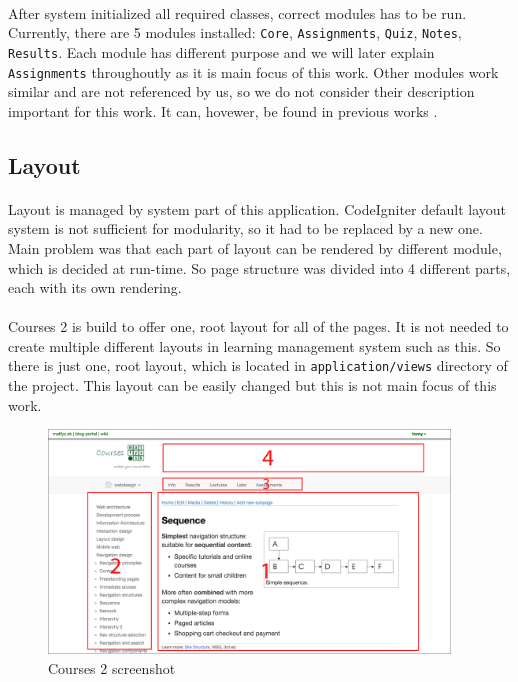 \paragraph{}
After system initialized all required classes, correct modules has to be run. Currently, there are 5 modules installed: \texttt{Core}, \texttt{Assignments}, \texttt{Quiz}, \texttt{Notes}, \texttt{Results}. Each module has different purpose and we will later explain \texttt{Assignments} throughoutly as it is main focus of this work. Other modules work similar and are not referenced by us, so we do not consider their description important for this work. It can, hovewer, be found in previous works \cite{culik}.

\subsection{Layout}
\paragraph{}
Layout is managed by system part of this application. CodeIgniter default layout system is not sufficient for modularity, so it had to be replaced by a new one. Main problem was that each part of layout can be rendered by different module, which is decided at run-time. So page structure was divided into 4 different parts, each with its own rendering.

\paragraph{}
Courses 2 is build to offer one, root layout for all of the pages. It is not needed to create multiple different layouts in learning management system such as this. So there is just one, root layout, which is located in \texttt{application/views} directory of the project. This layout can be easily changed but this is not main focus of this work.

\begin{figure}[h]
    \centering
    \includegraphics[width=0.95\textwidth]{images/courses-labelled.png}
    \caption{Courses 2 screenshot}
    \label{courses2screen}
\end{figure}

